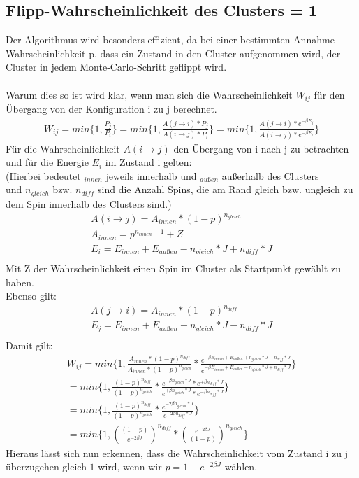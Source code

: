 \subsection{Flipp-Wahrscheinlichkeit des Clusters = 1}
Der Algorithmus wird besonders effizient, da bei einer bestimmten Annahme-Wahrscheinlichkeit p, dass ein Zustand in den Cluster aufgenommen wird, der Cluster in jedem Monte-Carlo-Schritt geflippt wird.\\\\
Warum dies so ist wird klar, wenn man sich die Wahrscheinlichkeit $W_{ij}$ für den Übergang von der Konfiguration i zu j berechnet.
\begin{align}
W_{ij} = min\{1, \frac{P_j}{P_i} \} = min\{1, \frac{A(j \rightarrow i) * P_j}{A(i \rightarrow j) * P_i} \} = min\{1, \frac{A(j \rightarrow i) * e^{-\beta E_j}}{A(i \rightarrow j) * e^{-\beta E_i}} \}
\end{align}
Für die Wahrscheinlichkeit $A(i \rightarrow j)$ den Übergang von i nach j zu betrachten und für die Energie $E_i$ im Zustand i gelten:\\
(Hierbei bedeutet $_{innen}$ jeweils innerhalb und $_{außen}$ außerhalb des Clusters\\
und $n_{gleich}$ bzw. $n_{diff}$ sind die Anzahl Spins, die am Rand gleich bzw. ungleich zu dem Spin innerhalb des Clusters sind.)
\begin{align}
A(i \rightarrow j)=A_{innen} * (1 - p)^{n_{gleich}}\\
A_{innen} = p^{n_{innen}-1} + Z\\
E_i = E_{innen} + E_{außen} - n_{gleich} * J + n_{diff} * J\\
\end{align}
Mit Z der Wahrscheinlichkeit einen Spin im Cluster als Startpunkt gewählt zu haben.\\
Ebenso gilt:
\begin{align}
A(j \rightarrow i)=A_{innen} * (1 - p)^{n_{diff}}\\
E_j = E_{innen} + E_{außen} + n_{gleich} * J - n_{diff} * J\\
\end{align}
Damit gilt:
\begin{align}
W_{ij} = min\{1, \frac{A_{innen}*(1-p)^{n_{diff}}}{A_{innen}*(1-p)^{n_{gleich}}} * \frac{e^{-\beta E_{innen} + E_{außen} + n_{gleich} * J - n_{diff} * J}}{e^{-\beta E_{innen} + E_{außen} - n_{gleich} * J + n_{diff} * J}}\} \\
= min\{1, \frac{(1-p)^{n_{diff}}}{(1-p)^{n_{gleich}}} * \frac{e^{-\beta n_{gleich} * J} * e^{+\beta n_{diff} * J}}{e^{+\beta n_{gleich} * J} * e^{-\beta n_{diff} * J}}\}\\
= min\{1, \frac{(1-p)^{n_{diff}}}{(1-p)^{n_{gleich}}} * \frac{e^{-2\beta n_{gleich} * J}}{e^{-2\beta n_{diff} * J}}\}\\
= min\{1, \left(\frac{(1-p)}{e^{-2\beta J}}\right)^{n_{diff}} * \left(\frac{e^{-2\beta J}}{(1-p)}\right)^{n_{gleich}}\}
\end{align}
Hieraus lässt sich nun erkennen, dass die Wahrscheinlichkeit vom Zustand i zu j überzugehen gleich $1$ wird, wenn wir $p = 1 - e^{-2\beta J}$ wählen.

